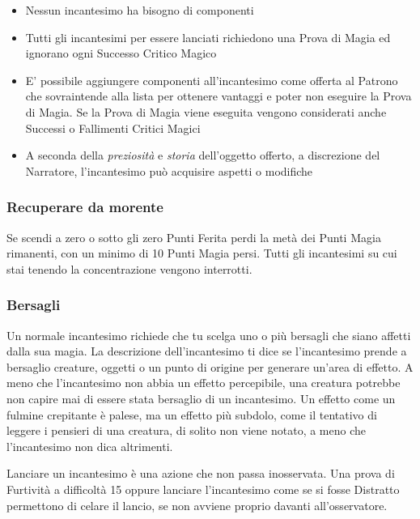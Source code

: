 \begin{multicols}{2}
\begin{itemize}[leftmargin=*] \setlength{\itemsep}{0pt}
\item Nessun incantesimo ha bisogno di componenti
\item Tutti gli incantesimi per essere lanciati richiedono una Prova di Magia ed ignorano ogni Successo Critico Magico
\item E' possibile aggiungere componenti all'incantesimo come offerta al Patrono che sovraintende alla lista per ottenere vantaggi e poter non eseguire la Prova di Magia. Se la Prova di Magia viene eseguita vengono considerati anche Successi o Fallimenti Critici Magici
\item A seconda della \emph{preziosità} e \emph{storia} dell'oggetto offerto, a discrezione del Narratore, l'incantesimo può acquisire aspetti o modifiche
\end{itemize}

\subsubsection{Recuperare da morente}\label{magieessereucciso}

Se scendi a zero o sotto gli zero Punti Ferita perdi la metà dei Punti Magia rimanenti, con un minimo di 10 Punti Magia persi. Tutti gli incantesimi su cui stai tenendo la concentrazione vengono interrotti.

\subsubsection{Bersagli}\label{magiebersagli}

Un normale incantesimo richiede che tu scelga uno o più bersagli che siano affetti dalla sua magia. La descrizione dell'incantesimo ti dice se l'incantesimo prende a bersaglio creature, oggetti o un punto di origine per generare un'area di effetto. A meno che l'incantesimo non abbia un effetto percepibile, una creatura potrebbe non capire mai di essere stata bersaglio di un incantesimo. Un effetto come un fulmine crepitante è palese, ma un effetto più subdolo, come il tentativo di leggere i pensieri di una creatura, di solito non viene notato, a meno che l'incantesimo non dica altrimenti.

Lanciare un incantesimo è una azione che non passa inosservata. Una prova di Furtività a difficoltà 15 oppure lanciare l'incantesimo come se si fosse Distratto permettono di celare il lancio, se non avviene proprio davanti all'osservatore.


\end{multicols}
